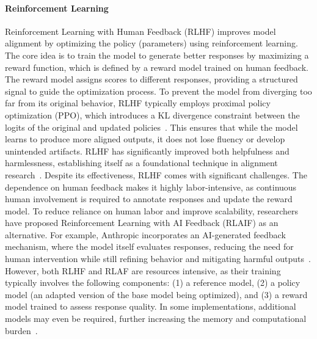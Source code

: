 \paragraph{Reinforcement Learning}  
Reinforcement Learning with Human Feedback (RLHF) improves model alignment by optimizing the policy (parameters) using reinforcement learning. The core idea is to train the model to generate better responses by maximizing a reward function, which is defined by a reward model trained on human feedback. The reward model assigns scores to different responses, providing a structured signal to guide the optimization process. To prevent the model from diverging too far from its original behavior, RLHF typically employs proximal policy optimization (PPO), which introduces a KL divergence constraint between the logits of the original and updated policies~\cite{christiano2017deep}. This ensures that while the model learns to produce more aligned outputs, it does not lose fluency or develop unintended artifacts. RLHF has significantly improved both helpfulness and harmlessness, establishing itself as a foundational technique in alignment research~\cite{ouyang2022training,bai2022training}. Despite its effectiveness, RLHF comes with significant challenges. The dependence on human feedback makes it highly labor-intensive, as continuous human involvement is required to annotate responses and update the reward model. To reduce reliance on human labor and improve scalability, researchers have proposed Reinforcement Learning with AI Feedback (RLAIF) as an alternative. For example, Anthropic incorporates an AI-generated feedback mechanism, where the model itself evaluates responses, reducing the need for human intervention while still refining behavior and mitigating harmful outputs~\cite{bai2022constitutional}. However, both RLHF and RLAF are resources intensive, as their training typically involves the following components: (1) a reference model, (2) a policy model (an adapted version of the base model being optimized), and (3) a reward model trained to assess response quality. In some implementations, additional models may even be required, further increasing the memory and computational burden~\cite{yao2023deepspeed}. 

